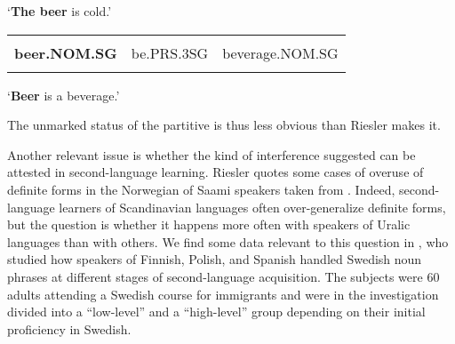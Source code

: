 \begin{styleTranslation}
‘\textbf{The beer} is cold.’

\end{styleTranslation}


\begin{listWWNumileveli}
\item {}

\end{listWWNumileveli}

\begin{tabular}{lll}
\lsptoprule
\multicolumn{3}{l}{{\bfseries Olut}

}\\
{\bfseries beer.NOM.SG} & be.PRS.3SG & beverage.NOM.SG\\
\lspbottomrule
\end{tabular}

\begin{styleTranslation}
‘\textbf{Beer} is a beverage.’

\end{styleTranslation}

\begin{styleBodyTextFirst}
The unmarked status of the partitive is thus less obvious than Riesler makes it. 

\end{styleBodyTextFirst}

\begin{styleBodytextC}
Another relevant issue is whether the kind of interference suggested can be attested in second-language learning. Riesler quotes some cases of overuse of definite forms in the Norwegian of Saami speakers taken from \citet{Bull1995}. Indeed, second-language learners of Scandinavian languages often over-generalize definite forms, but the question is whether it happens more often with speakers of Uralic languages than with others. We find some data relevant to this question in \citet{Axelsson1994}, who studied how speakers of Finnish, Polish, and Spanish handled Swedish noun phrases at different stages of second-language acquisition. The subjects were 60 adults attending a Swedish course for immigrants and were in the investigation divided into a “low-level” and a “high-level” group depending on their initial proficiency in Swedish.

\end{styleBodytextC}

